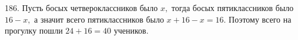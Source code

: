 186. Пусть босых четвероклассников было $x,$ тогда босых пятиклассников было $16-x,$ а значит всего пятиклассников было $x+16-x=16.$ Поэтому всего на прогулку пошли $24+16=40$ учеников.\\
